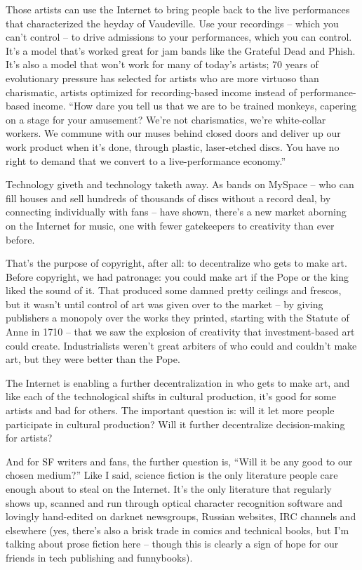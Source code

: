 Those artists can use the Internet to bring people back to the live
performances that characterized the heyday of Vaudeville. Use your
recordings -- which you can't control -- to drive admissions to
your performances, which you can control. It's a model that's
worked great for jam bands like the Grateful Dead and Phish. It's
also a model that won't work for many of today's artists; 70 years
of evolutionary pressure has selected for artists who are more
virtuoso than charismatic, artists optimized for recording-based
income instead of performance-based income. ``How dare you tell us
that we are to be trained monkeys, capering on a stage for your
amusement? We're not charismatics, we're white-collar workers. We
commune with our muses behind closed doors and deliver up our work
product when it's done, through plastic, laser-etched discs. You
have no right to demand that we convert to a live-performance
economy.''

Technology giveth and technology taketh away. As bands on MySpace
-- who can fill houses and sell hundreds of thousands of discs
without a record deal, by connecting individually with fans -- have
shown, there's a new market aborning on the Internet for music, one
with fewer gatekeepers to creativity than ever before.

That's the purpose of copyright, after all: to decentralize who
gets to make art. Before copyright, we had patronage: you could
make art if the Pope or the king liked the sound of it. That
produced some damned pretty ceilings and frescos, but it wasn't
until control of art was given over to the market -- by giving
publishers a monopoly over the works they printed, starting with
the Statute of Anne in 1710 -- that we saw the explosion of
creativity that investment-based art could create. Industrialists
weren't great arbiters of who could and couldn't make art, but they
were better than the Pope.

The Internet is enabling a further decentralization in who gets to
make art, and like each of the technological shifts in cultural
production, it's good for some artists and bad for others. The
important question is: will it let more people participate in
cultural production? Will it further decentralize decision-making
for artists?

And for SF writers and fans, the further question is, ``Will it be
any good to our chosen medium?'' Like I said, science fiction is the
only literature people care enough about to steal on the Internet.
It's the only literature that regularly shows up, scanned and run
through optical character recognition software and lovingly
hand-edited on darknet newsgroups, Russian websites, IRC channels
and elsewhere (yes, there's also a brisk trade in comics and
technical books, but I'm talking about prose fiction here -- though
this is clearly a sign of hope for our friends in tech publishing
and funnybooks).

